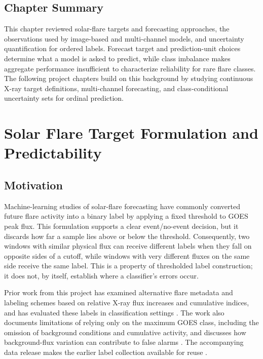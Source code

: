 \documentclass[12pt]{report}
\begin{document}
\section{Chapter Summary}

This chapter reviewed solar-flare targets and forecasting approaches, the observations used by image-based and multi-channel models, and uncertainty quantification for ordered labels. Forecast target and prediction-unit choices determine what a model is asked to predict, while class imbalance makes aggregate performance insufficient to characterize reliability for rare flare classes. The following project chapters build on this background by studying continuous X-ray target definitions, multi-channel forecasting, and class-conditional uncertainty sets for ordinal prediction.

\chapter{Solar Flare Target Formulation and Predictability}
\label{chap:project1}

\section{Motivation}

Machine-learning studies of solar-flare forecasting have commonly converted future flare activity into a binary label by applying a fixed threshold to GOES peak flux. This formulation supports a clear event/no-event decision, but it discards how far a sample lies above or below the threshold. Consequently, two windows with similar physical flux can receive different labels when they fall on opposite sides of a cutoff, while windows with very different fluxes on the same side receive the same label. This is a property of thresholded label construction; it does not, by itself, establish where a classifier's errors occur.

Prior work from this project has examined alternative flare metadata and labeling schemes based on relative X-ray flux increases and cumulative indices, and has evaluated these labels in classification settings \citep{hong2023innovative,hong2023beyond,hong2023enhancing}. The work also documents limitations of relying only on the maximum GOES class, including the omission of background conditions and cumulative activity, and discusses how background-flux variation can contribute to false alarms \citep{hong2023beyond,hong2023enhancing}. The accompanying data release makes the earlier label collection available for reuse \citep{hong2023data}.
\end{document}
